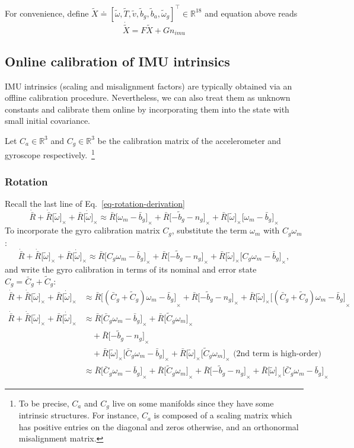 \documentclass[letter,10pt]{article}
\newcommand{\real}{\mathbb{R}}
\newcommand{\asym}[1]{{\lbrack #1\rbrack}_\times{}}
\begin{document}
For convenience, define $\tilde X \doteq [\tilde \omega, \tilde T, \tilde v, \tilde b_g, \tilde b_a, \tilde\omega_g]^\top \in \real^{18}$ and equation above reads
\begin{equation}
\dot{\tilde X} = F \tilde X + G n_{imu}
\end{equation}

\subsection{Online calibration of IMU intrinsics}
IMU intrinsics (scaling and misalignment factors) are typically obtained via an offline calibration procedure. Nevertheless, we can also treat them as unknown constants and calibrate them online by incorporating them into the state with small initial covariance. 

Let $C_a\in\real^3$ and $C_g\in\real^3$ be the calibration matrix of the accelerometer and gyroscope respectively.~\footnote{To be precise, $C_a$ and $C_g$ live on some manifolds since they have some intrinsic structures. For instance, $C_a$ is composed of a scaling matrix which has positive entries on the diagonal and zeros otherwise, and an orthonormal misalignment matrix.}

\subsubsection{Rotation}
Recall the last line of Eq.~\eqref{eq-rotation-derivation}
$$
 \dot{\bar R} + \dot{\bar R} \asym{\tilde \omega} + \bar R \asym{\dot{\tilde\omega}} \approx \bar R\asym{\omega_m-\bar b_g} + \bar R\asym{-\tilde b_g - n_g} + \bar R \asym{\tilde \omega}\asym{\omega_m-\bar b_g}
$$
To incorporate the gyro calibration matrix $C_g$, substitute the term $\omega_m$ with $C_g\omega_m$:
$$
 \dot{\bar R} + \dot{\bar R} \asym{\tilde \omega} + \bar R \asym{\dot{\tilde\omega}} \approx \bar R\asym{C_g\omega_m-\bar b_g} + \bar R\asym{-\tilde b_g - n_g} + \bar R \asym{\tilde \omega}\asym{C_g\omega_m-\bar b_g},
$$
and write the gyro calibration in terms of its nominal and error state $C_g=\bar C_g + \tilde C_g$:
\begin{align}
 \dot{\bar R} + \dot{\bar R} \asym{\tilde \omega} + \bar R \asym{\dot{\tilde\omega}}
  &\approx \bar R\asym{(\bar C_g + \tilde C_g)\omega_m-\bar b_g} + \bar R\asym{-\tilde b_g - n_g} + \bar R \asym{\tilde \omega}\asym{(\bar C_g + \tilde C_g)\omega_m-\bar b_g}\\
 \dot{\bar R} + \dot{\bar R} \asym{\tilde \omega} + \bar R \asym{\dot{\tilde\omega}}
  &\approx 
  \bar R\asym{\bar C_g\omega_m-\bar b_g} 
  + \bar R\asym{\tilde C_g\omega_m} \\
  & \quad + \bar R\asym{-\tilde b_g - n_g}  \\
  & \quad + \bar R \asym{\tilde \omega}\asym{\bar C_g\omega_m-\bar b_g}
  + \bar R \asym{\tilde \omega}\asym{\tilde C_g\omega_m} \text{ (2nd term is high-order)}\\
  &\approx
  \bar R\asym{\bar C_g\omega_m-\bar b_g} + \bar R\asym{\tilde C_g\omega_m}
  + \bar R\asym{-\tilde b_g - n_g} + \bar R \asym{\tilde \omega}\asym{\bar C_g\omega_m-\bar b_g}
\end{align}
\end{document}
